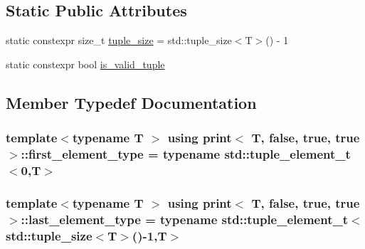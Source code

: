 \subsection*{Static Public Attributes}
\begin{DoxyCompactItemize}
\item 
static constexpr size\+\_\+t \hyperlink{structprint_3_01T_00_01false_00_01true_00_01true_01_4_a9e916cb79c7ac38e78590d3c30b633e7}{tuple\+\_\+size} = std\+::tuple\+\_\+size$<$T$>$() -\/ 1
\item 
static constexpr bool \hyperlink{structprint_3_01T_00_01false_00_01true_00_01true_01_4_ac26cb1e1f2d4e622fc9bd7ba97555dc4}{is\+\_\+valid\+\_\+tuple}
\end{DoxyCompactItemize}


\subsection{Member Typedef Documentation}
\subsubsection[{\texorpdfstring{first\+\_\+element\+\_\+type}{first_element_type}}]{\setlength{\rightskip}{0pt plus 5cm}template$<$typename T $>$ using {\bf print}$<$ T, false, true, true $>$\+::{\bf first\+\_\+element\+\_\+type} =  typename std\+::tuple\+\_\+element\+\_\+t$<$0,T$>$}\hypertarget{structprint_3_01T_00_01false_00_01true_00_01true_01_4_a2dae0d9d3db0a28ae73051bef2394aaa}{}\label{structprint_3_01T_00_01false_00_01true_00_01true_01_4_a2dae0d9d3db0a28ae73051bef2394aaa}
\subsubsection[{\texorpdfstring{last\+\_\+element\+\_\+type}{last_element_type}}]{\setlength{\rightskip}{0pt plus 5cm}template$<$typename T $>$ using {\bf print}$<$ T, false, true, true $>$\+::{\bf last\+\_\+element\+\_\+type} =  typename std\+::tuple\+\_\+element\+\_\+t$<$std\+::tuple\+\_\+size$<$T$>$()-\/1,T$>$}\hypertarget{structprint_3_01T_00_01false_00_01true_00_01true_01_4_a7409ff0e8e3242c751eaec334842ae4a}{}\label{structprint_3_01T_00_01false_00_01true_00_01true_01_4_a7409ff0e8e3242c751eaec334842ae4a}


